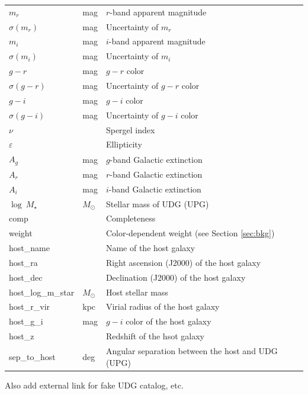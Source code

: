 \documentclass[twocolumn,astrosymb,twocolappendix]{aastex631}
\begin{document}
\begin{CJK*}{UTF8}{gbsn}
\begin{table}
\begin{center}
\begin{tabular}{l l l}
$m_r$                    & mag     & $r$-band apparent magnitude     \\
$\sigma(m_r)$            & mag     & Uncertainty of $m_r$            \\
$m_i$                    & mag     & $i$-band apparent magnitude     \\
$\sigma(m_i)$            & mag     & Uncertainty of $m_i$            \\
$g-r$                    & mag     & $g-r$ color                     \\
$\sigma(g-r)$            & mag     & Uncertainty of $g-r$ color      \\
$g-i$                    & mag     & $g-i$ color                     \\
$\sigma(g-i)$            & mag     & Uncertainty of $g-i$ color      \\
$\nu$                    &         & Spergel index              \\
$\varepsilon$            &         & Ellipticity                     \\
$A_g$                    & mag     & $g$-band Galactic extinction \\
$A_r$                    & mag     & $r$-band Galactic extinction \\
$A_i$                    & mag     & $i$-band Galactic extinction \\
$\log\ M_\star$ & $M_\odot$ & Stellar mass of UDG (UPG) \\
comp & & Completeness \\
weight & & Color-dependent weight (see Section \ref{sec:bkg}) \\
host\_name & & Name of the host galaxy \\
host\_ra & & Right ascension (J2000) of the host galaxy \\
host\_dec & & Declination (J2000) of the host galaxy \\
host\_log\_m\_star & $M_\odot$ & Host stellar mass\\
host\_r\_vir & kpc & Virial radius of the host galaxy \\
host\_g\_i & mag & $g-i$ color of the host galaxy \\
host\_z &  & Redshift of the hsot galaxy \\
sep\_to\_host & deg & Angular separation between the host and UDG (UPG)\\
\hline\hline
\end{tabular}
\end{center}
\end{table}

Also add external link for fake UDG catalog, etc. 


\end{CJK*}
\end{document}
